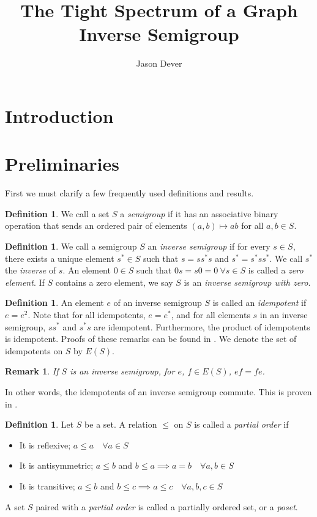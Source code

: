 \documentclass[12pt]{article}
\title{The Tight Spectrum of a Graph Inverse Semigroup}
\author{Jason Dever}
\newtheorem{remark}[theorem]{Remark}
\theoremstyle{definition}
\newtheorem{definition}[theorem]{Definition}
\begin{document}
\date{}
\maketitle

\section{Introduction}
\section{Preliminaries}
First we must clarify a few frequently used definitions and results.

\begin{definition}
    We call a set $S$ a \emph{semigroup} if it has an associative binary operation
    that sends an ordered pair of elements $(a, b) \mapsto ab$ for all $a, b \in S$.
\end{definition}

\begin{definition}
    We call a semigroup $S$ an \emph{inverse semigroup} if for every $s \in S$, there exists a unique
    element $s^* \in S$ such that $s = ss^*s$ and $s^* = s^*ss^*$. We call $s^*$ the \emph{inverse} of $s$.
    An element $0 \in S$ such that $0s = s0 = 0 \ \forall s \in S$ is called a \emph{zero element}.
    If $S$ contains a zero element, we say $S$ is an \emph{inverse semigroup with zero}.
\end{definition}

\begin{definition}
    An element $e$ of an inverse semigroup $S$ is called an \emph{idempotent} if
    $e = e^2$. Note that for all idempotents, $e = e^*$, and for all elements $s$ in
    an inverse semigroup, $ss^*$ and $s^*s$ are idempotent. Furthermore, 
    the product of idempotents is idempotent. Proofs of these remarks can be found
    in \parencite[Section 3]{cheaney}. We denote the set of idempotents on $S$ by $E(S)$.
\end{definition}

\begin{remark}
    If $S$ is an inverse semigroup, for $e$, $f \in E(S)$, $ef = fe$.
\end{remark}
In other words, the idempotents of an inverse semigroup commute. This is proven
in \parencite[Theorem 3.2]{cheaney}.

\begin{definition}
    Let $S$ be a set. A relation $\leq$ on $S$ is called a \emph{partial order} if
    \begin{itemize}
        \item It is reflexive; $a \leq a \quad \forall a \in S$
        \item It is antisymmetric; $a \leq b$ and $b \leq a \implies a = b \quad \forall a, b \in S$
        \item It is transitive; $a \leq b$ and $b \leq c \implies a \leq c \quad \forall a, b, c \in S$
    \end{itemize}
    A set $S$ paired with a \emph{partial order} is called a partially ordered set, or a \emph{poset}.
\end{definition}
\end{document}
